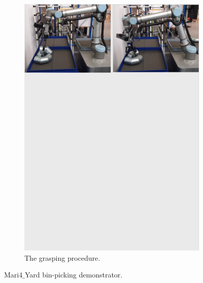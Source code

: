 \begin{figure}[h!]
{\begin{tcolorbox}
\begin{subfigure}[c]{1\textwidth}
          \includegraphics[trim={0cm 22cm 0cm 0cm},clip,width=1\linewidth,angle=0]{Cap5/Figuras/picking_mari4yard/grasping.pdf}
         \caption{The grasping procedure.}
         \label{fig:multi_side_bracket}
      \end{subfigure}
     \end{tcolorbox}
     \caption{Mari4$\_$Yard bin-picking demonstrator.}
     \label{fig:demo_mari4yard}
   }%
 \end{figure}


